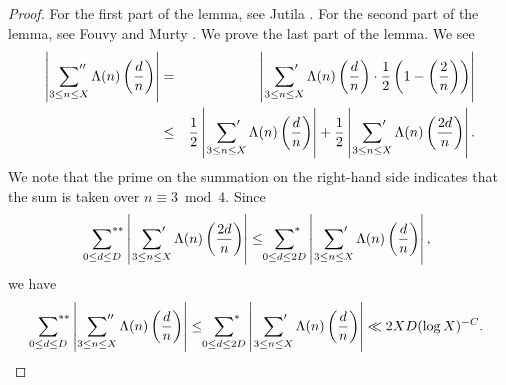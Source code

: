 \documentclass[a4paper, 11pt]{article}
\theoremstyle{plain}
\newcommand{\?}{\textcolor{red}{??}}
\begin{document}
\begin{proof}
    For the first part of the lemma, see Jutila \cite[Lemma 8]{Ju}.
    For the second part of the lemma, see Fouvy and Murty \cite[Lemma 6]{FM01}. We prove the last part of the lemma. We see 
\begin{eqnarray*}
    \left| \  \sideset{}{''} \sum_{3 \le n \le X} \Lambda(n) \left( \frac{d}{n}\right) \right|&=&\left|\, \sideset{}{'} \sum_{3 \le n \le X} \Lambda(n) \left( \frac{d}{n}\right) \cdot \frac{1}{2} \left(1 - \left( \frac{2}{n} \right) \right) \right|\\
    &\le& \frac{1}{2}\left|\, \sideset{}{'} \sum_{3 \le n \le X} \Lambda(n) \left( \frac{d}{n}\right) \right| +\frac{1}{2}\left|\, \sideset{}{'} \sum_{3 \le n \le X} \Lambda(n) \left( \frac{2d}{n}\right) \right|.
\end{eqnarray*}
We note that the prime on the summation on the right-hand side indicates that the sum is taken over $n \equiv 3\bmod4 $. 
Since 
\[
\sideset{}{^{**}} \sum_{0\le d \le D} \left|\, \sideset{}{'} \sum_{3 \le n \le X} \Lambda(n) \left( \frac{2d}{n}\right) \right| \le \sideset{}{^{*}} \sum_{0\le d \le 2D} \left|\, \sideset{}{'} \sum_{3 \le n \le X} \Lambda(n) \left( \frac{d}{n}\right) \right|,
\]
    we have
    \begin{eqnarray*}
       \sideset{}{^{**}} \sum_{0\le d \le D} \left| \  \sideset{}{''} \sum_{3 \le n \le X} \Lambda(n) \left( \frac{d}{n}\right) \right| \le \sideset{}{^{*}} \sum_{0\le d \le 2D} \left|\, \sideset{}{'} \sum_{3 \le n \le X} \Lambda(n) \left( \frac{d}{n}\right) \right|\ll  2XD(\log X)^{-C}.
    \end{eqnarray*}

    
\end{proof}

\end{document}

